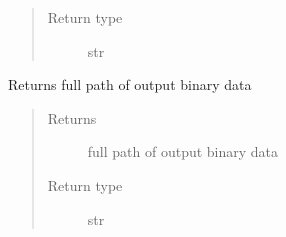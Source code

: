 \documentclass[letterpaper,10pt,english]{sphinxmanual}
\begin{document}
\begin{fulllineitems}
\begin{fulllineitems}
\begin{quote}
\begin{description}
\item[{Return type}] \leavevmode
str

\end{description}\end{quote}

\end{fulllineitems}


\begin{fulllineitems}
\label{\detokenize{MouseReferenceManual:Modules.Base.HomogenizationModuleBaseClass.outputFileName}}
Returns full path of output binary data
\begin{quote}\begin{description}
\item[{Returns}] \leavevmode
full path of output binary data

\item[{Return type}] \leavevmode
str

\end{description}\end{quote}

\end{fulllineitems}


\end{fulllineitems}

\end{document}
